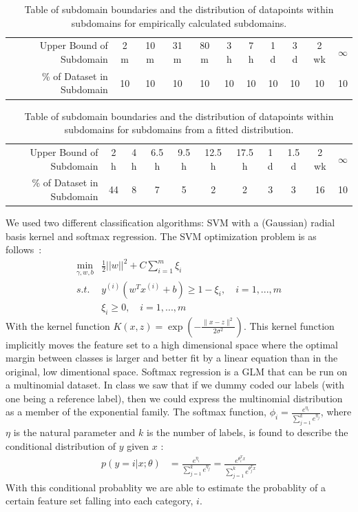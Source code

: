 \documentclass[11pt]{article}
\begin{document}
\begin{table}
\begin{tabular}{r||c|c|c|c|c|c|c|c|c|c}
Upper Bound of Subdomain & 2 m & 10 m & 31 m & 80 m & 3 h & 7 h & 1 d & 3 d & 2 wk & $\infty$\\
\% of Dataset in Subdomain & 10 & 10 & 10 & 10 & 10 & 10 & 10 & 10 & 10 & 10
\end{tabular}
\caption{Table of subdomain boundaries and the distribution of datapoints within subdomains for empirically calculated subdomains.}
\label{opt1}
\end{table}

\begin{table}
\begin{tabular}{r||c|c|c|c|c|c|c|c|c|c}
Upper Bound of Subdomain & 2 h & 4 h & 6.5 h & 9.5 h & 12.5 h & 17.5 h & 1 d & 1.5 d & 2 wk & $\infty$\\
\% of Dataset in Subdomain & 44 & 8 & 7 & 5 & 2 & 2 & 3 & 3 & 16 & 10
\end{tabular}
\caption{Table of subdomain boundaries and the distribution of datapoints within subdomains for subdomains from a fitted distribution.}
\label{opt2}
\end{table}

We used two different classification algorithms: SVM with a (Gaussian) radial basis kernel and softmax regression. The SVM optimization problem is as follows~\cite{Ng:15,HCL:10,BoV:04}:
\begin{align*}
\min_{\gamma,w,b} & \frac{1}{2}||w||^2 + C \sum_{i=1}^{m}\xi_i \\
s.t. & y^{(i)}(w^Tx^{(i)} + b) \ge 1 - \xi_i, \quad i = 1,...,m \\
& \xi_i \ge 0, \quad i = 1,...,m
\end{align*}
With the kernel function $K(x,z) = \exp \left(-\frac{\|x-z\|^2}{2\sigma^2}\right)$. This kernel function implicitly moves the feature set to a high dimensional space where the optimal margin between classes is larger and better fit by a linear equation than in the original, low dimentional space. Softmax regression is a GLM that can be run on a multinomial dataset. In class we saw that if we dummy coded our labels (with one being a reference label), then we could express the multinomial distribution as a member of the exponential family. The softmax function, $\phi_i = \frac{e^{\eta_i}}{\sum_{j=1}^{k}e^{\eta_j}}$, where $\eta$ is the natural parameter and $k$ is the number of labels, is found to describe the conditional distribution of $y$ given $x$ : 
\begin{align*}
     p(y=i | x; \theta) &= \frac{e^{\eta_i}}{\sum_{j=1}^{k}e^{\eta_j}} =
     \frac{e^{\theta_i^Tx}}{\sum_{j=1}^{k}e^{\theta_j^Tx}}
\end{align*}
With this conditional probablity we are able to estimate the probablity of a certain feature set falling into each category, $i$.
\end{document}
